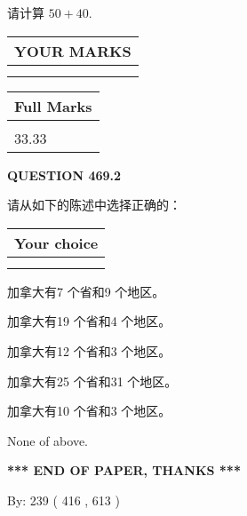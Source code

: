 \documentclass{ctexart}
\begin{document}
  
 
请计算 $ %
50 +  %
40 $.
 

 

 
  
\vspace{0.2in}
  
\noindent\begin{tabular}{|l|}
\hline
 YOUR MARKS  \\
\hline
 \\ 
 \\ 
\hline
\end{tabular}
\hspace{0.05in} \begin{tabular}{|l|}
\hline
 Full Marks  \\
\hline
 \\ 
33.33 \\
\hline
\end{tabular}
{\textbf{\Large{QUESTION
469.2 
}}}
  
  
请从如下的陈述中选择正确的：
  
  
\noindent\hspace{3.0in} \begin{tabular}{|l|}
\hline
Your choice \\
\hline
 \\ 
 \\ 
\hline
\end{tabular}
  
  
 
 
加拿大有7 个省和9 个地区。
 
 
加拿大有19 个省和4 个地区。
 
 
加拿大有12 个省和3 个地区。
 
 
加拿大有25 个省和31 个地区。
 
 
加拿大有10 个省和3 个地区。
 
 
 None of above.
 
 
   
   
 \vspace{0.2in}
 
   
   
   
   
\vspace{1.0in} 
{\textbf{\large{ *** END OF PAPER, THANKS *** }}} 
   
   
\hspace{1.0in} By: 
 239 ( 416 ,  613 )
   
\end{document}

